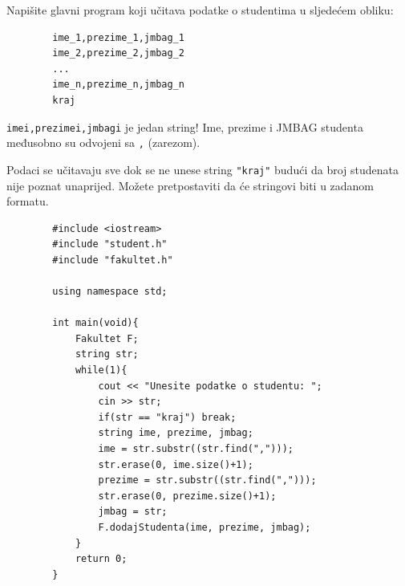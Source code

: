 \begin{zadatak} \label{zad:split-string}
    Napišite glavni program koji učitava podatke o studentima u sljedećem obliku:
    \begin{verbatim}
        ime_1,prezime_1,jmbag_1
        ime_2,prezime_2,jmbag_2
        ...
        ime_n,prezime_n,jmbag_n
        kraj
    \end{verbatim}
    \texttt{ime\textunderscore i,prezime\textunderscore i,jmbag\textunderscore i} je jedan string! Ime, prezime i JMBAG studenta međusobno su odvojeni sa \texttt{,} (zarezom).

    Podaci se učitavaju sve dok se ne unese string \texttt{"kraj"} budući da broj studenata nije poznat unaprijed. Možete pretpostaviti da će stringovi biti u zadanom formatu.
\end{zadatak}

\begin{rjesenje}
    \begin{verbatim}
        #include <iostream>
        #include "student.h"
        #include "fakultet.h"

        using namespace std;
        
        int main(void){
            Fakultet F;
            string str;
            while(1){
                cout << "Unesite podatke o studentu: ";
                cin >> str;
                if(str == "kraj") break;
                string ime, prezime, jmbag;
                ime = str.substr((str.find(",")));
                str.erase(0, ime.size()+1);
                prezime = str.substr((str.find(",")));
                str.erase(0, prezime.size()+1);
                jmbag = str;
                F.dodajStudenta(ime, prezime, jmbag);
            }
            return 0;
        }
    \end{verbatim}
\end{rjesenje}


